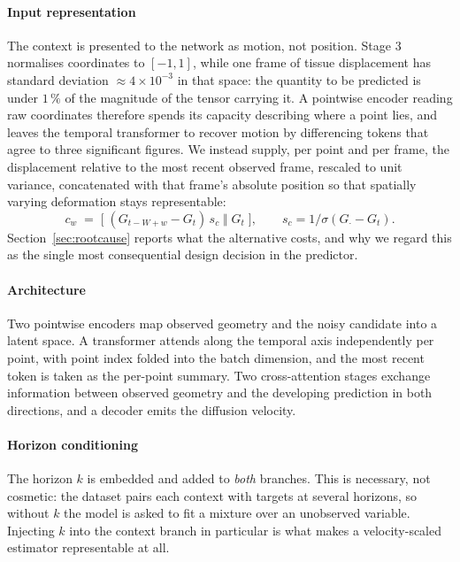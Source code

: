 \documentclass[conference]{IEEEtran}
\begin{document}
\paragraph{Input representation} The context is presented to the network as
motion, not position. Stage 3 normalises coordinates to $[-1,1]$, while one frame of
tissue displacement has standard deviation $\approx\!4\times10^{-3}$ in that space:
the quantity to be predicted is under $1\,\%$ of the magnitude of the tensor carrying
it. A pointwise encoder reading raw coordinates therefore spends its capacity
describing where a point lies, and leaves the temporal transformer to recover motion
by differencing tokens that agree to three significant figures. We instead supply, per
point and per frame, the displacement relative to the most recent observed frame,
rescaled to unit variance, concatenated with that frame's absolute position so that
spatially varying deformation stays representable:
\begin{equation}
c_{w} \;=\; \big[\;(G_{t-W+w} - G_{t})\,s_c \;\big\Vert\; G_{t}\;\big],
\qquad s_c = 1/\sigma\!\left(G_{\cdot} - G_{t}\right).
\label{eq:ctx}
\end{equation}
Section~\ref{sec:rootcause} reports what the alternative costs, and why we regard this
as the single most consequential design decision in the predictor.

\paragraph{Architecture} Two pointwise encoders map observed geometry and the noisy
candidate into a latent space. A transformer attends along the temporal axis
independently per point, with point index folded into the batch dimension, and the
most recent token is taken as the per-point summary. Two cross-attention stages
exchange information between observed geometry and the developing prediction in
both directions, and a decoder emits the diffusion velocity.

\paragraph{Horizon conditioning} The horizon $k$ is embedded and added to
\emph{both} branches. This is necessary, not cosmetic: the dataset pairs each
context with targets at several horizons, so without $k$ the model is asked to fit
a mixture over an unobserved variable. Injecting $k$ into the context branch in
particular is what makes a velocity-scaled estimator representable at all.
\end{document}
